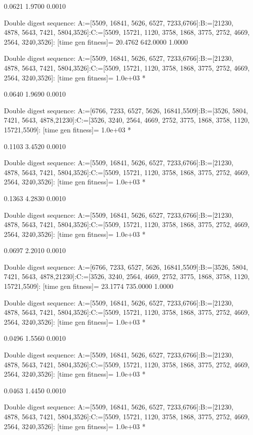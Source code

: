     0.0621    1.9700    0.0010

Double digest sequence:
A:=[5509, 16841, 5626, 6527, 7233,6766]:B:=[21230, 4878, 5643, 7421, 5804,3526]:C:=[5509, 15721, 1120, 3758, 1868, 3775, 2752, 4669, 2564, 3240,3526]:
[time gen fitness]=
   20.4762  642.0000    1.0000

Double digest sequence:
A:=[5509, 16841, 5626, 6527, 7233,6766]:B:=[21230, 4878, 5643, 7421, 5804,3526]:C:=[5509, 15721, 1120, 3758, 1868, 3775, 2752, 4669, 2564, 3240,3526]:
[time gen fitness]=
   1.0e+03 *

    0.0640    1.9690    0.0010

Double digest sequence:
A:=[6766, 7233, 6527, 5626, 16841,5509]:B:=[3526, 5804, 7421, 5643, 4878,21230]:C:=[3526, 3240, 2564, 4669, 2752, 3775, 1868, 3758, 1120, 15721,5509]:
[time gen fitness]=
   1.0e+03 *

    0.1103    3.4520    0.0010

Double digest sequence:
A:=[5509, 16841, 5626, 6527, 7233,6766]:B:=[21230, 4878, 5643, 7421, 5804,3526]:C:=[5509, 15721, 1120, 3758, 1868, 3775, 2752, 4669, 2564, 3240,3526]:
[time gen fitness]=
   1.0e+03 *

    0.1363    4.2830    0.0010

Double digest sequence:
A:=[5509, 16841, 5626, 6527, 7233,6766]:B:=[21230, 4878, 5643, 7421, 5804,3526]:C:=[5509, 15721, 1120, 3758, 1868, 3775, 2752, 4669, 2564, 3240,3526]:
[time gen fitness]=
   1.0e+03 *

    0.0697    2.2010    0.0010

Double digest sequence:
A:=[6766, 7233, 6527, 5626, 16841,5509]:B:=[3526, 5804, 7421, 5643, 4878,21230]:C:=[3526, 3240, 2564, 4669, 2752, 3775, 1868, 3758, 1120, 15721,5509]:
[time gen fitness]=
   23.1774  735.0000    1.0000

Double digest sequence:
A:=[5509, 16841, 5626, 6527, 7233,6766]:B:=[21230, 4878, 5643, 7421, 5804,3526]:C:=[5509, 15721, 1120, 3758, 1868, 3775, 2752, 4669, 2564, 3240,3526]:
[time gen fitness]=
   1.0e+03 *

    0.0496    1.5560    0.0010

Double digest sequence:
A:=[5509, 16841, 5626, 6527, 7233,6766]:B:=[21230, 4878, 5643, 7421, 5804,3526]:C:=[5509, 15721, 1120, 3758, 1868, 3775, 2752, 4669, 2564, 3240,3526]:
[time gen fitness]=
   1.0e+03 *

    0.0463    1.4450    0.0010

Double digest sequence:
A:=[5509, 16841, 5626, 6527, 7233,6766]:B:=[21230, 4878, 5643, 7421, 5804,3526]:C:=[5509, 15721, 1120, 3758, 1868, 3775, 2752, 4669, 2564, 3240,3526]:
[time gen fitness]=
   1.0e+03 *

